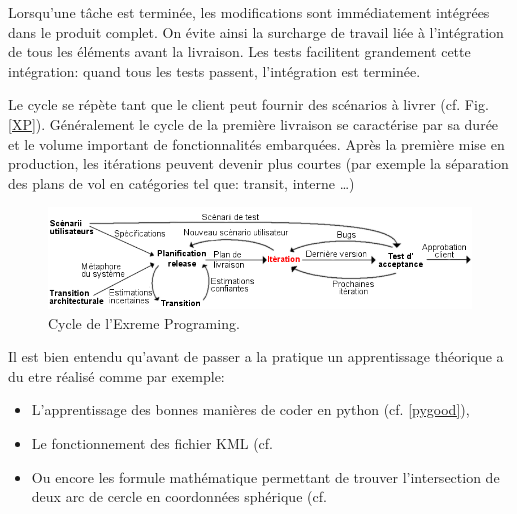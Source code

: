 Lorsqu'une tâche est terminée, les modifications sont immédiatement intégrées dans le produit complet. On évite ainsi la surcharge de travail liée à l'intégration de tous les éléments avant la livraison. Les tests facilitent grandement cette intégration: quand tous les tests passent, l'intégration est terminée.

Le cycle se répète tant que le client peut fournir des scénarios à livrer (cf. Fig. \vref{XP}). Généralement le cycle de la première livraison se caractérise par sa durée et le volume important de fonctionnalités embarquées. Après la première mise en production, les itérations peuvent devenir plus courtes (par exemple la séparation des plans de vol en catégories tel que: transit, interne …)
\begin{figure}
\center
\includegraphics[width=15cm]{images/xp.png}
\caption{Cycle de l'Exreme Programing.}
\label{XP}
\end{figure}

Il est bien entendu qu'avant de passer a la pratique un apprentissage théorique a du etre réalisé comme par exemple:
\begin{itemize}
\item L'apprentissage des bonnes manières de coder en python (cf. \vref{pygood}),
\item Le fonctionnement des fichier KML (cf. %
\item Ou encore les formule mathématique permettant de trouver l'intersection de deux arc de cercle en coordonnées sphérique (cf. %
\end{itemize}
